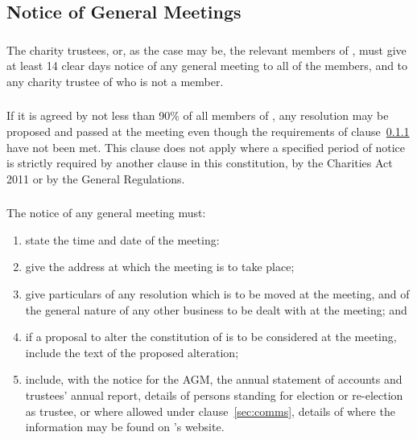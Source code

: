     \subsection{Notice of General Meetings}\label{sec:general_meetings_notice}

        \subsubsection{}\label{sec:general_meetings_notice_general}
        The charity trustees, or, as the case may be, the relevant members of \shortname{}, must give at least 14 clear days notice of any general meeting to all of the members, and to any charity trustee of \shortname{} who is not a member.

        \subsubsection{}
        If it is agreed by not less than 90\% of all members of \shortname{}, any resolution may be proposed and passed at the meeting even though the requirements of clause~\ref{sec:general_meetings_notice_general} have not been met. This clause does not apply where a specified period of notice is strictly required by another clause in this constitution, by the Charities Act 2011 or by the General Regulations.

        \subsubsection{}
        The notice of any general meeting must:
        \begin{enumerate}
            \item state the time and date of the meeting:
            \item give the address at which the meeting is to take place;
            \item give particulars of any resolution which is to be moved at the meeting, and of the general nature of any other business to be dealt with at the meeting; and
            \item if a proposal to alter the constitution of \shortname{} is to be considered at the meeting, include the text of the proposed alteration;
            \item include, with the notice for the AGM, the annual statement of accounts and trustees’ annual report, details of persons standing for election or re-election as trustee, or where allowed under clause~\ref{sec:comms}, details of where the information may be found on \shortname{}’s website.
        \end{enumerate}

